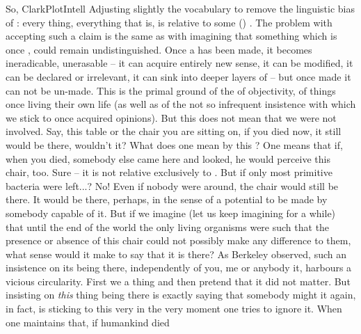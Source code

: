 \pa So, \citet{there can be no things with determinate natures unless there are
  true descriptions, and no true descriptions unless the intellect is already at
  work.}{ClarkPlotIntell}{} Adjusting slightly the vocabulary to
  remove the linguistic bias of :
every thing, everything that is, is relative to some ()
.  The problem with accepting such a claim is the same as with
imagining that something which is once , could remain
undistinguished.  Once a  has been made, it becomes
ineradicable, unerasable -- it can acquire entirely new sense, it can be
modified, it can be declared  or irrelevant, it can sink into deeper
layers of  -- but once made it can not be un-made. This is the
primal ground of the  of objectivity, of things once
   living their own life (as well as of the not so
infrequent insistence with which we stick to once acquired opinions). But this
does not mean that we were not involved.  Say, this table or the chair you are
  sitting on, if you died now, it
still would be there, wouldn't it? What does one mean by this ? One
means that if, when you died, somebody else came here and looked, he would
perceive this chair, too. Sure -- it is not relative exclusively to . But if only most primitive bacteria were left...? No! Even if
nobody were around, the chair would still be there. It would be there, perhaps,
in the sense of a potential  to be made by somebody capable of
it. But if we imagine (let us keep imagining for a while) that until the end of
the world the only living organisms were such that the presence or absence of
this chair could not possibly make any difference to them, what sense would it
make to say that it is there?  As Berkeley observed, such an insistence on its
being there, independently of you, me or anybody  it, harbours a
vicious circularity. First we  a thing and then pretend that it
did not matter.  But insisting on {\em this} thing being there is exactly saying
that somebody might  it again, in fact, is sticking to this very
 in the very moment one tries to ignore it.  When one maintains that, if humankind died
